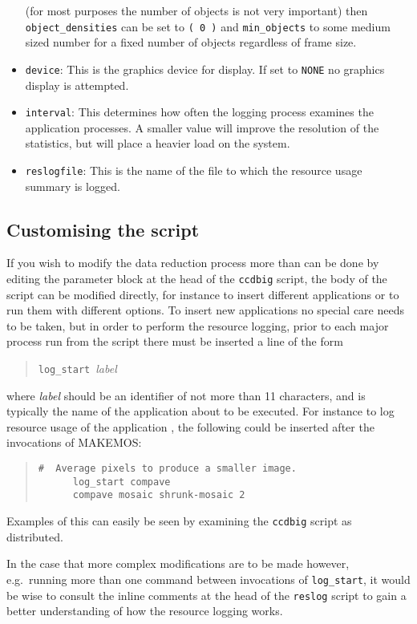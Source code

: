 \begin{itemize}
(for most purposes the number of objects is not very important)
then {\tt object\_densities} can be set to {\tt ( 0 )} and
{\tt min\_objects} to some medium sized number for a fixed
number of objects regardless of frame size.
%
\item {\tt device}:
This is the graphics device for display.
If set to {\tt NONE} no graphics display is attempted.
%
\item {\tt interval}:
This determines how often the logging process examines the 
application processes. 
A smaller value will improve the resolution of the statistics,
but will place a heavier load on the system.
%
\item {\tt reslogfile}:
This is the name of the file to which the resource usage summary is logged.
\end{itemize}


\subsection{Customising the script}
 \label{sec:adapt}

If you wish to modify the data reduction process more
than can be done by editing the parameter block
at the head of the {\tt ccdbig} script,
the body of the script can be modified directly,
for instance to insert different applications or 
to run them with different options.
To insert new applications no special
care needs to be taken, but in order to perform the 
resource logging, 
prior to each major process run from the script
there must be inserted a line of the form
\begin{quote}
{\tt log\_start}\ {\it label}
\end{quote}
where {\it label} should be an identifier of not more
than 11 characters, 
and is typically the name of the application about to be executed.
For instance to log resource usage of the {\KAPPAref}
application ,
the following could be inserted
after the invocations of MAKEMOS:
\begin{quote}
\begin{verbatim}
#  Average pixels to produce a smaller image.
      log_start compave
      compave mosaic shrunk-mosaic 2
\end{verbatim}
\end{quote}
Examples of this can easily be seen by examining the {\tt ccdbig} 
script as distributed.

In the case that more complex modifications are to be
made however, e.g.\ running more than one command 
between invocations of {\tt log\_start}, 
it would be wise to consult the inline comments 
at the head of the {\tt reslog}
script to gain a better understanding of how the
resource logging works.



